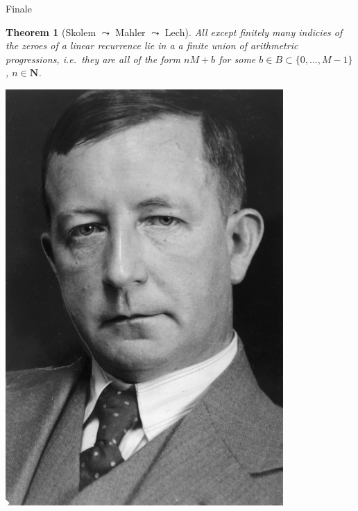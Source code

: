 \documentclass[notheorems]{beamer}
\theoremstyle{plain}
\newtheorem{theorem}{Theorem}[section]
\theoremstyle{definition}
\theoremstyle{definition}
\theoremstyle{definition}
\newcommand{\NN}{\mathbf{N}}
\begin{document}
\begin{frame}{Finale}
\begin{theorem}[{Skolem \(\leadsto\) Mahler \(\leadsto\) Lech}]
All except finitely many indicies of the zeroes of a linear recurrence lie in a a finite union of arithmetric progressions, i.e.\ they are all of the form \(nM + b\) for some \(b \in B \subset \{0, \ldots, M-1\}\), \(n \in \NN\).%
\end{theorem}
\pause
\includegraphics[height = 0.6\textheight]{skolem.jpeg}
\end{frame}
\end{document}
